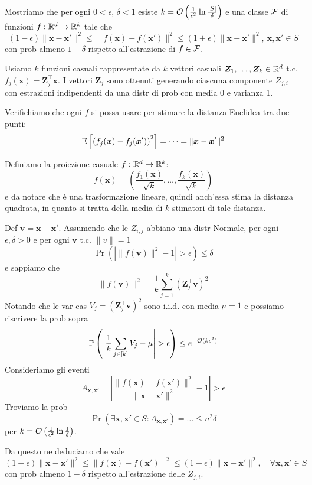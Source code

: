 Mostriamo che per ogni $0 < \epsilon$, $\delta < 1$ esiste $k = \mathcal{O} \left(\frac{1}{\epsilon^2} \ln \frac{|S|}{\delta} \right)$ e una classe $\mathcal{F}$ di funzioni $f: \mathbb{R}^d \rightarrow \mathbb{R}^k$ tale che
$$ \left(1 - \epsilon\right) \|\bm x - \bm x' \|^2 \leq \| f(\bm x) - f (\bm x') \|^2 \leq (1 + \epsilon) \| \bm x - \bm x' \|^2, \ \bm x, \bm x' \in S $$
con prob almeno $1 - \delta$ rispetto all'estrazione di $f \in \mathcal{F}$.

Usiamo $k$ funzioni casuali rappresentate da $k$ vettori casuali $\bm Z_1, \dots, \bm Z_k \in \mathbb{R}^d$ t.c. $ f_j (\bm x) = \bm Z_j^\top \bm x$. I vettori $\bm Z_j$ sono ottenuti generando ciascuna componente $Z_{j,i}$ con estrazioni indipendenti da una distr di prob con media 0 e varianza 1.

Verifichiamo che ogni $f$ si possa usare per stimare la distanza Euclidea tra due punti: 
$$ \mathbb{E} \left[\left(f_j (\bm x) - f_j (\bm x')\right)^2 \right] = \dots = \|\bm x - \bm x' \|^2 $$

Definiamo la proiezione casuale $f: \mathbb{R}^d \rightarrow \mathbb{R}^k$: 
$$ f(\bm x) = \left(\frac{f_1 (\bm x)}{\sqrt{k}}, \dots, \frac{f_k (\bm x)}{\sqrt{k}}\right) $$
e da notare che è una trasformazione lineare, quindi anch'essa stima la distanza quadrata, in quanto si tratta della media di $k$ stimatori di tale distanza.

Def $\bm v = \bm x - \bm x'$. Assumendo che le $Z_{i,j}$ abbiano una distr Normale, per ogni $\epsilon, \delta > 0$ e per ogni $\bm v$ t.c. $\|v\| = 1$
$$ \Pr \left(\left|\|f (\bm v)\|^2 - 1\right| > \epsilon \right) \leq \delta $$
e sappiamo che 
$$ \|f(\bm v)\|^2 = \frac{1}{k} \sum_{j = 1}^k \left(\bm Z_j^\top \bm v \right)^2 $$
Notando che le var cas $V_j = \left(\bm Z_j^\top \bm v\right)^2$ sono i.i.d. con media $\mu = 1$ e possiamo riscrivere la prob sopra 
$$ \mathbb{P} \left(\left|\frac{1}{k} \sum_{j \in [k]} V_j - \mu \right| > \epsilon \right) \leq e^{- \mathcal{O} (k \epsilon^2)} $$
Consideriamo gli eventi 
$$ A_{\bm x, \bm x'} = \left|\frac{\|f(\bm x) - f (\bm x') \|^2}{\| \bm x - \bm x' \|^2} - 1\right| > \epsilon $$
Troviamo la prob 
$$ \Pr \left(\exists \bm x, \bm x' \in S : A_{\bm x, \bm x'}\right) = \dots \leq n^2 \delta $$
per $k = \mathcal{O} \left(\frac{1}{\epsilon^2} \ln \frac{1}{\delta} \right)$.

Da questo ne deduciamo che vale 
$$ (1 - \epsilon) \| \bm x - \bm x' \|^2 \leq \| f(\bm x) - f(\bm x') \|^2 \leq (1 + \epsilon) \| \bm x - \bm x' \|^2, \quad \forall \bm x, \bm x' \in S $$
con prob almeno $1-\delta$ rispetto all'estrazione delle $Z_{j,i}$.